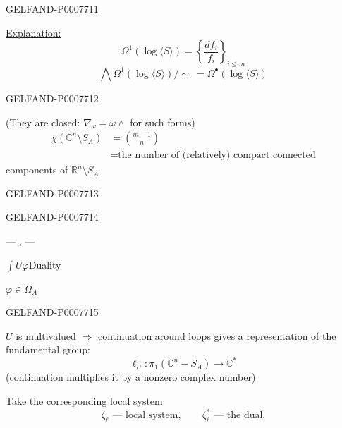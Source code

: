 \begin{GelfandAdjacentEvidence}{GELFAND-P000771}{1}

\underline{Explanation:}
\[
\Omega^1(\log\langle S\rangle)=\left\{\frac{df_i}{f_i}\right\}_{i\le m}
\]
\[
\bigwedge\Omega^1(\log\langle S\rangle)/\sim\ =\Omega^\bullet(\log\langle S\rangle)
\]
\end{GelfandAdjacentEvidence}
\begin{GelfandAdjacentEvidence}{GELFAND-P000771}{2}


(They are closed: \(\nabla_\omega=\omega\wedge\) for such forms)
\[
\begin{aligned}
\chi(\mathbb C^n\setminus S_A)&=\binom{m-1}{n}\\
&=\text{the number of (relatively) compact connected}
\end{aligned}
\]
components of \(\mathbb R^n\setminus S_A\)
\end{GelfandAdjacentEvidence}
\begin{GelfandAdjacentEvidence}{GELFAND-P000771}{3}

\end{GelfandAdjacentEvidence}
\begin{GelfandAdjacentEvidence}{GELFAND-P000771}{4}


\begin{center}--- , ---\end{center}

\(\displaystyle\int U\varphi\)\quad Duality

\(\varphi\in\Omega_A\)
\end{GelfandAdjacentEvidence}
\begin{GelfandAdjacentEvidence}{GELFAND-P000771}{5}


\(U\) is multivalued \(\Rightarrow\) continuation around loops gives a representation of the fundamental group:
\[
\ell_U:\pi_1(\mathbb C^n-S_A)\longrightarrow\mathbb C^*
\]
(continuation multiplies it by a nonzero complex number)

Take the corresponding local system
\[
\zeta_\ell\text{ --- local system},\qquad
\zeta_\ell^*\text{ --- the dual}.
\]
\end{GelfandAdjacentEvidence}
